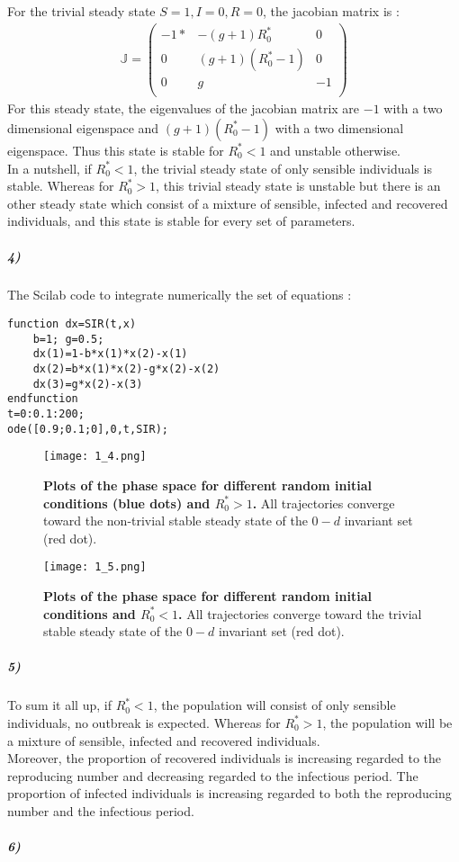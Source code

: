\documentclass{article}
\begin{document}
For the trivial steady state $ S=1,I=0,R=0$, the jacobian matrix is :
\begin{align*}
\mathbb{J}=
\begin{pmatrix}
-1 * & -(g+1)R_0^* & 0   \\
0 & (g+1)(R_0^*-1) & 0  \\
0 & g & -1   \\
\end{pmatrix}
\end{align*}
For this steady state, the eigenvalues of the jacobian matrix are $-1$ with a two dimensional eigenspace and $(g+1)(R_0^*-1)$ with a two dimensional eigenspace.
Thus this state is stable for $R_0^*<1$ and unstable otherwise. \\
In a nutshell, if $R_0^*<1$, the trivial steady state of only sensible individuals is stable. Whereas for $R_0^*>1$, this trivial steady state is unstable but there is an other steady state which consist of a mixture of sensible, infected and recovered individuals, and this state is stable for every set of parameters.
\subparagraph{4)}
The Scilab code to integrate numerically the set of equations :
\begin{lstlisting}
function dx=SIR(t,x)
    b=1; g=0.5;
    dx(1)=1-b*x(1)*x(2)-x(1)
    dx(2)=b*x(1)*x(2)-g*x(2)-x(2)
    dx(3)=g*x(2)-x(3)
endfunction
t=0:0.1:200;
ode([0.9;0.1;0],0,t,SIR);
\end{lstlisting}
\begin{figure}[H]
	  \centering
  	\texttt{[image: 1\_4.png]}
  	\caption{\textbf{Plots of the phase space for different random initial conditions (blue dots) and $R_0^*>1$.} All trajectories converge toward the non-trivial stable steady state of the $0-d$ invariant set (red dot).}
  	\texttt{[image: 1\_5.png]}
  	\caption{\textbf{Plots of the phase space for different random initial conditions and $R_0^*<1$.} All trajectories converge toward the trivial stable steady state of the $0-d$ invariant set (red dot).}
	\end{figure}
\subparagraph{5)}
To sum it all up, if $R_0^*<1$, the population will consist of only sensible individuals, no outbreak is expected. Whereas for $R_0^*>1$, the population will be a mixture of sensible, infected and recovered individuals. \\
Moreover, the proportion of recovered individuals is increasing regarded to the reproducing number and decreasing regarded to the infectious period. The proportion of infected individuals is increasing regarded to both the reproducing number and the infectious period.
\subparagraph{6)}
\end{document}
